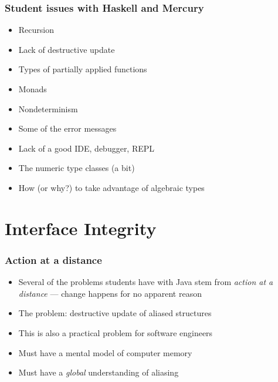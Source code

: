 \documentclass[12pt]{beamer}
\begin{document}
\begin{frame}
\frametitle{Student issues with Haskell and Mercury}
\begin{itemize}
\item Recursion
\item Lack of destructive update
\item Types of partially applied functions
\item Monads
\item Nondeterminism
\item Some of the error messages
\item Lack of a good IDE, debugger, REPL
\item The numeric type classes (a bit)
\item How (or why?) to take advantage of algebraic types
\end{itemize}

\end{frame}


\section{Interface Integrity}

\begin{frame}
\frametitle{Action at a distance}
\begin{itemize}
\item Several of the problems students have with Java stem from
  \emph{action at a distance} --- change happens for no apparent reason
\item The problem:  destructive update of aliased structures
\item This is also a practical problem for software engineers
\item Must have a mental model of computer memory
\item Must have a \emph{global} understanding of aliasing

\end{itemize}

\end{frame}
\end{document}
